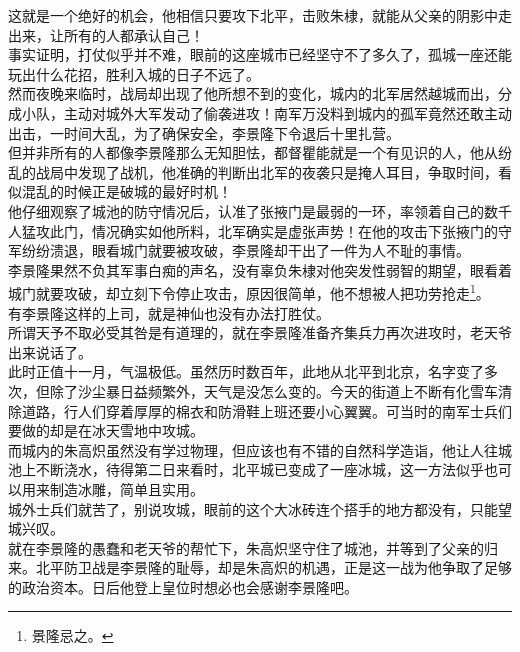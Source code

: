 \begin{multicols}{\theparacolNo}
这就是一个绝好的机会，他相信只要攻下北平，击败朱棣，就能从父亲的阴影中走出来，让所有的人都承认自己！\\

事实证明，打仗似乎并不难，眼前的这座城市已经坚守不了多久了，孤城一座还能玩出什么花招，胜利入城的日子不远了。\\

然而夜晚来临时，战局却出现了他所想不到的变化，城内的北军居然越城而出，分成小队，主动对城外大军发动了偷袭进攻！南军万没料到城内的孤军竟然还敢主动出击，一时间大乱，为了确保安全，李景隆下令退后十里扎营。\\

但并非所有的人都像李景隆那么无知胆怯，都督瞿能就是一个有见识的人，他从纷乱的战局中发现了战机，他准确的判断出北军的夜袭只是掩人耳目，争取时间，看似混乱的时候正是破城的最好时机！\\

他仔细观察了城池的防守情况后，认准了张掖门是最弱的一环，率领着自己的数千人猛攻此门，情况确实如他所料，北军确实是虚张声势！在他的攻击下张掖门的守军纷纷溃退，眼看城门就要被攻破，李景隆却干出了一件为人不耻的事情。\\

李景隆果然不负其军事白痴的声名，没有辜负朱棣对他突发性弱智的期望，眼看着城门就要攻破，却立刻下令停止攻击，原因很简单，他不想被人把功劳抢走\footnote{景隆忌之。}。\\

有李景隆这样的上司，就是神仙也没有办法打胜仗。\\

所谓天予不取必受其咎是有道理的，就在李景隆准备齐集兵力再次进攻时，老天爷出来说话了。\\

此时正值十一月，气温极低。虽然历时数百年，此地从北平到北京，名字变了多次，但除了沙尘暴日益频繁外，天气是没怎么变的。今天的街道上不断有化雪车清除道路，行人们穿着厚厚的棉衣和防滑鞋上班还要小心翼翼。可当时的南军士兵们要做的却是在冰天雪地中攻城。\\

而城内的朱高炽虽然没有学过物理，但应该也有不错的自然科学造诣，他让人往城池上不断浇水，待得第二日来看时，北平城已变成了一座冰城，这一方法似乎也可以用来制造冰雕，简单且实用。\\

城外士兵们就苦了，别说攻城，眼前的这个大冰砖连个搭手的地方都没有，只能望城兴叹。\\

就在李景隆的愚蠢和老天爷的帮忙下，朱高炽坚守住了城池，并等到了父亲的归来。北平防卫战是李景隆的耻辱，却是朱高炽的机遇，正是这一战为他争取了足够的政治资本。日后他登上皇位时想必也会感谢李景隆吧。\\


\end{multicols}
